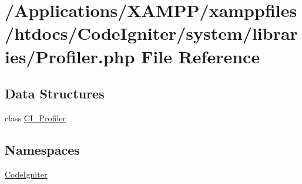 \hypertarget{system_2libraries_2profiler_8php}{}\section{/\+Applications/\+X\+A\+M\+P\+P/xamppfiles/htdocs/\+Code\+Igniter/system/libraries/\+Profiler.php File Reference}
\label{system_2libraries_2profiler_8php}
\subsection*{Data Structures}
\begin{DoxyCompactItemize}
\item 
class \mbox{\hyperlink{class_c_i___profiler}{C\+I\+\_\+\+Profiler}}
\end{DoxyCompactItemize}
\subsection*{Namespaces}
\begin{DoxyCompactItemize}
\item 
 \mbox{\hyperlink{namespace_code_igniter}{Code\+Igniter}}
\end{DoxyCompactItemize}
